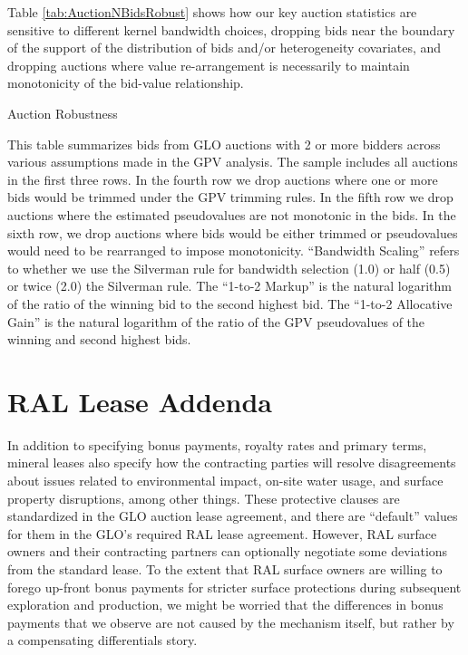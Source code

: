 \documentclass[12pt]{article}
\begin{document}
\begin{appendices}
Table \ref{tab:AuctionNBidsRobust} shows how our key auction statistics are sensitive to different kernel bandwidth choices, dropping bids near the boundary of the support of the distribution of bids and/or heterogeneity covariates, and dropping auctions where value re-arrangement is necessarily to maintain monotonicity of the bid-value relationship.
\addtolength{\tabcolsep}{4pt}
\begin{table}[H]
\begin{center}
\begin{threeparttable}
	\caption{Auction Robustness}
	\label{tab:AuctionNBidsRobust}
 	\small
   	            
    \footnotesize
    \begin{tablenotes}
    	\item This table summarizes bids from GLO auctions with 2 or more bidders across various assumptions made in the GPV analysis.  The sample includes all auctions in the first three rows.  In the fourth row we drop auctions where one or more bids would be trimmed under the GPV trimming rules.  In the fifth row we drop auctions where the estimated pseudovalues are not monotonic in the bids.  In the sixth row, we drop auctions where bids would be either trimmed or pseudovalues would need to be rearranged to impose monotonicity. ``Bandwidth Scaling'' refers to whether we use the Silverman rule for bandwidth selection (1.0) or half (0.5) or twice (2.0) the Silverman rule. The ``1-to-2 Markup'' is the natural logarithm of the ratio of the winning bid to the second highest bid.  The ``1-to-2 Allocative Gain'' is the natural logarithm of the ratio of the GPV pseudovalues of the winning and second highest bids.
    \end{tablenotes}
\end{threeparttable}
\end{center}
\end{table}

\pagebreak

\section{RAL Lease Addenda}\label{sec:Appendix_Addenda}
In addition to specifying bonus payments, royalty rates and primary terms, mineral leases also specify how the contracting parties will resolve disagreements about issues related to environmental impact, on-site water usage, and surface property disruptions, among other things.  These protective clauses are standardized in the GLO auction lease agreement, and there are ``default'' values for them in the GLO's required RAL lease agreement.  However, RAL surface owners and their contracting partners can optionally negotiate some deviations from the standard lease.  To the extent that RAL surface owners are willing to forego up-front bonus payments for stricter surface protections during subsequent exploration and production, we might be worried that the differences in bonus payments that we observe are not caused by the mechanism itself, but rather by a compensating differentials story.  


\end{appendices}
\end{document}

